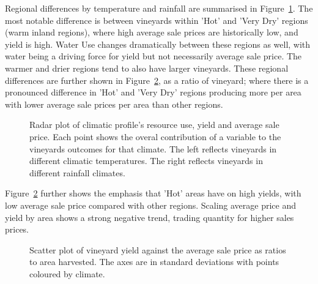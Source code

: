 \documentclass[10pt,letterpaper]{article}
\begin{document}
Regional differences by temperature and rainfall are summarised in Figure~\ref{fig:spider}. The most notable difference is between vineyards within 'Hot' and 'Very Dry' regions (warm inland regions), where high average sale prices are historically low, and yield is high. Water Use changes dramatically between these regions as well, with water being a driving force for yield but not necessarily average sale price. The warmer and drier regions tend to also have larger vineyards. These regional differences are further shown in Figure~\ref{fig:yield_vs_value_area}, as a ratio of vineyard; where there is a pronounced difference in 'Hot' and 'Very Dry' regions producing more per area with lower average sale prices per area than other regions.
\par
\begin{figure}[htb]
  \caption{Radar plot of climatic profile's resource use, yield and average sale price. Each point shows the overal contribution of a variable to the vineyards outcomes for that climate. The left reflects vineyards in different climatic temperatures. The right reflects vineyards in different rainfall climates.}\label{fig:spider}
\end{figure}

Figure~\ref{fig:yield_vs_value_area} further shows the emphasis that 'Hot' areas have on high yields, with low average sale price compared with other regions. Scaling average price and yield by area shows a strong negative trend, trading quantity for higher sales prices.
\par
\begin{figure}[htb]
    \caption{Scatter plot of vineyard yield against the average sale price as ratios to area harvested. The axes are in standard deviations with points coloured by climate.}\label{fig:yield_vs_value_area}
\end{figure}
\end{document}
